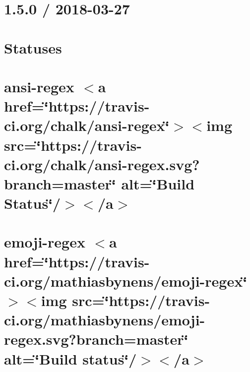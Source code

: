 \let\mypdfximage\pdfximage\def\pdfximage{\immediate\mypdfximage}\documentclass[twoside]{book}
\newcommand{\+}{\discretionary{\mbox{\scriptsize$\hookleftarrow$}}{}{}}
\begin{document}
\chapter{1.5.0 / 2018-\/03-\/27}
\label{md__c_1__git_hub__p_r_o_y_e_c_t_o-_i_i_i-_g_o_t_rest-api-node-mysql_node_modules_statuses__h_i_s_t_o_r_y}

\chapter{Statuses}
\label{md__c_1__git_hub__p_r_o_y_e_c_t_o-_i_i_i-_g_o_t_rest-api-node-mysql_node_modules_statuses__r_e_a_d_m_e}

\chapter{ansi-\/regex $<$a href=\char`\"{}https\+://travis-\/ci.\+org/chalk/ansi-\/regex\char`\"{}$>$$<$img src=\char`\"{}https\+://travis-\/ci.\+org/chalk/ansi-\/regex.\+svg?branch=master\char`\"{} alt=\char`\"{}\+Build Status\char`\"{}/$>$$<$/a$>$}
\label{md__c_1__git_hub__p_r_o_y_e_c_t_o-_i_i_i-_g_o_t_rest-api-node-mysql_node_modules_string-width_node_modules_ansi-regex_readme}

\chapter{emoji-\/regex $<$a href=\char`\"{}https\+://travis-\/ci.\+org/mathiasbynens/emoji-\/regex\char`\"{}$>$$<$img src=\char`\"{}https\+://travis-\/ci.\+org/mathiasbynens/emoji-\/regex.\+svg?branch=master\char`\"{} alt=\char`\"{}\+Build status\char`\"{}/$>$$<$/a$>$}
\label{md__c_1__git_hub__p_r_o_y_e_c_t_o-_i_i_i-_g_o_t_rest-api-node-mysql_node_modules_string-width_no5313669cb2cc8414bb613860a6826559}

\end{document}
